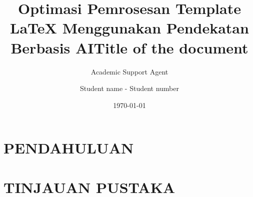 \documentclass{ipb}
\title{Optimasi Pemrosesan Template LaTeX Menggunakan Pendekatan Berbasis AI}
\author{Academic Support Agent}
\date{\today}
\begin{document}
\maketitle

\begin{abstract}

\end{abstract}

\chapter{PENDAHULUAN}


\chapter{TINJAUAN PUSTAKA}




\usepackage[english]{babel}
\graphicspath{{./images/}}
\usepackage{listings} %
\usepackage{url} %
\usepackage[colorlinks=true,
                    urlcolor=black, %
                    linkcolor=black,
                    citecolor=black, %
                    bookmarks=true,
                    pdfstartview=FitH]{hyperref}

\usepackage[style=ieee,backend=biber]{biblatex}

\usepackage{todonotes}

\usepackage{lipsum}

\usepackage{tabulary}

\usepackage{algorithm}
\usepackage{boxedminipage}

\usepackage{algpseudocode}
\usepackage{caption}

\usepackage{booktabs}


\title{Title of the document}

\author{Student name - Student number}


\end{document}
